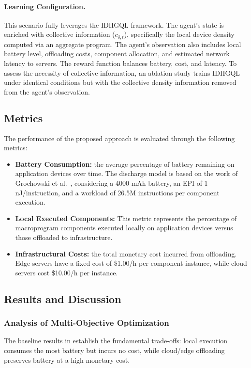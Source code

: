 \paragraph{Learning Configuration.} This scenario fully leverages the IDHGQL framework. 
The agent's state is enriched with collective information ($c_{\delta,t}$), 
specifically the local device density computed via an aggregate program. 
The agent's observation also includes local battery level, 
offloading costs, component allocation, and estimated network latency to servers.
The reward function balances battery, cost, and latency. 
To assess the necessity of collective information, an ablation study trains IDHGQL
 under identical conditions but with the collective density information removed from the agent's observation.

\subsection{Metrics}
The performance of the proposed approach is evaluated through the following metrics:
\begin{itemize}
  \item \textbf{Battery Consumption:} the average percentage of battery remaining on application devices over time. 
  The discharge model is based on the work of Grochowski et al.~\cite{Grochowski2006EnergyPI}, considering a 4000 mAh battery, an EPI of 1 nJ/instruction, and a workload of 26.5M instructions per component execution.
  \item \textbf{Local Executed Components:} This metric represents the percentage of macroprogram components executed locally on application devices versus those offloaded to infrastructure.
  \item \textbf{Infrastructural Costs:} the total monetary cost incurred from offloading. Edge servers have a fixed cost of \$1.00/h per component instance, while cloud servers cost \$10.00/h per instance.
\end{itemize}

\subsection{Results and Discussion}
\subsubsection{Analysis of Multi-Objective Optimization}
The baseline results in  establish the fundamental trade-offs: 
local execution consumes the most battery but incurs no cost, 
while cloud/edge offloading preserves battery at a high monetary cost.

